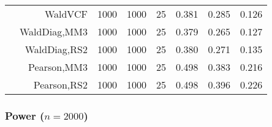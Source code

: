 \documentclass[
]{article}
\begin{document}
\begin{table}[H]
{\begin{tabular}[t]{lrrrrrrr}
\hspace{1em} & WaldVCF & 1000 & 1000 & 25 & 0.381 & 0.285 & 0.126\\

\hspace{1em} & WaldDiag,MM3 & 1000 & 1000 & 25 & 0.379 & 0.265 & 0.127\\

\hspace{1em} & WaldDiag,RS2 & 1000 & 1000 & 25 & 0.380 & 0.271 & 0.135\\

\hspace{1em} & Pearson,MM3 & 1000 & 1000 & 25 & 0.498 & 0.383 & 0.216\\

\hspace{1em} & Pearson,RS2 & 1000 & 1000 & 25 & 0.498 & 0.396 & 0.226\\
\bottomrule
\end{tabular}}
\endgroup{}
\end{table}

\hypertarget{power-n2000}{%
\subsubsection{\texorpdfstring{Power
(\(n=2000\))}{Power (n=2000)}}\label{power-n2000}}
\end{document}
